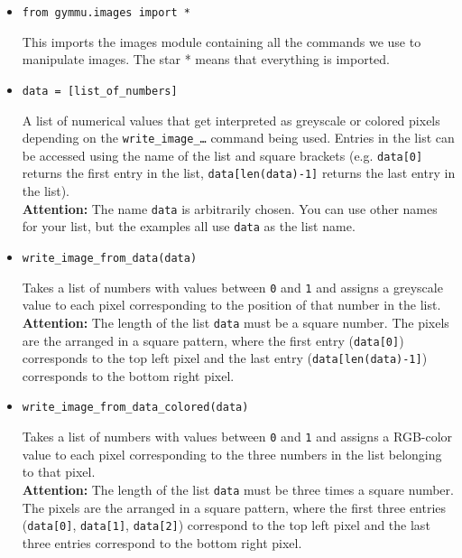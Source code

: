 \documentclass[11pt,a4paper]{report}
\begin{document}
 \begin{itemize}
\item \begin{lstlisting}
from gymmu.images import *
\end{lstlisting}

This imports the images \gls{module} containing all the commands we use to manipulate images. The star * means that everything is imported.


\item \begin{lstlisting}
data = [list_of_numbers]
\end{lstlisting}

A list of numerical values that get interpreted as greyscale or colored pixels depending on the \texttt{write\_image\_\ldots} command being used. Entries in the list can be accessed using the name of the list and square brackets (e.g. \texttt{data[0]} returns the first entry in the list, \texttt{data[len(data)-1]} returns the last entry in  the list).\\
{\bf Attention:} The name \texttt{data} is arbitrarily  chosen.  You can use other names for your list, but the examples all  use \texttt{data} as the list name.


\item \begin{lstlisting}
write_image_from_data(data)
\end{lstlisting}

Takes a list of numbers with values between \texttt{0} and \texttt{1} and assigns a greyscale value to each pixel corresponding to the position of that number  in  the list. \\
{\bf Attention:} The length of the list \texttt{data} must be a square number. The pixels are the arranged in a square pattern, where the first entry (\texttt{data[0]}) corresponds to  the top left pixel and the last entry (\texttt{data[len(data)-1]}) corresponds to the bottom right pixel.

\item \begin{lstlisting}
write_image_from_data_colored(data)
\end{lstlisting}

Takes a list of numbers with values between \texttt{0} and \texttt{1} and assigns a \gls{RGB-color} value to each pixel corresponding to the three numbers in  the list  belonging to that pixel. \\
{\bf Attention:} The length of the list \texttt{data} must be three times a square number. The pixels are the arranged in a square pattern, where the first three entries (\texttt{data[0]}, \texttt{data[1]}, \texttt{data[2]}) correspond to the top left pixel and the last three entries  correspond to the bottom right pixel.




\end{itemize}

\printglossary
\end{document}

